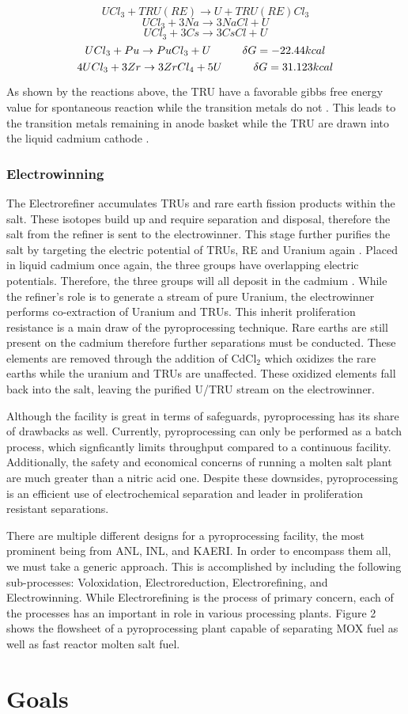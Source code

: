 \[ UCl_3+TRU(RE) \rightarrow U + TRU(RE)Cl_3 \]
\[ UCl_3 + 3Na \rightarrow 3NaCl + U \]
\[ UCl_3 + 3Cs \rightarrow 3CsCl + U \]
\[ UCl_3 + Pu \rightarrow PuCl_3 + U \hspace{10mm} \delta G = -22.44kcal \]
\[ 4UCl_3 + 3Zr \rightarrow 3ZrCl_4 + 5U \hspace{10mm} \delta G = 31.123kcal \]

As shown by the reactions above, the TRU have a favorable gibbs free energy value for spontaneous reaction while the transition metals do not \cite{supy}.
This leads to the transition metals remaining in anode basket while the TRU are drawn into the liquid cadmium cathode \cite{lee_korean_2011}.


\subsubsection{Electrowinning}
The Electrorefiner accumulates TRUs and rare earth fission products within the salt.
These isotopes build up and require separation and disposal, therefore the salt from the refiner is sent to the electrowinner.
This stage further purifies the salt by targeting the electric potential of TRUs, RE and Uranium again \cite{lee_korean_2011,organisation}.
Placed in liquid cadmium once again, the three groups have overlapping electric potentials.
Therefore, the three groups will all deposit in the cadmium \cite{lee_korean_2011}. 
While the refiner's role is to generate a stream of pure Uranium, the electrowinner performs co-extraction of Uranium and TRUs.
This inherit proliferation resistance is a main draw of the pyroprocessing technique.
Rare earths are still present on the cadmium therefore further separations must be conducted.
These elements are removed through the addition of CdCl$_2$ which oxidizes the rare earths while the uranium and TRUs are unaffected.
These oxidized elements fall back into the salt, leaving the purified U/TRU stream on the electrowinner.


Although the facility is great in terms of safeguards, pyroprocessing has its share of drawbacks as well.
Currently, pyroprocessing can only be performed as a batch process, which signficantly limits throughput compared to a continuous facility. 
Additionally, the safety and economical concerns of running a molten salt plant are much greater than a nitric acid one.
Despite these downsides, pyroprocessing is an efficient use of electrochemical separation and leader in proliferation resistant separations.

There are multiple different designs for a pyroprocessing facility, the most prominent being from ANL, INL, and KAERI. In order to encompass them all, we must take a generic approach. This is accomplished by including the following sub-processes: Voloxidation, Electroreduction, Electrorefining, and Electrowinning. While Electrorefining is the process of primary concern, each of the processes has an important in role in various processing plants. Figure 2 shows the flowsheet of a pyroprocessing plant capable of separating MOX fuel as well as fast reactor molten salt fuel.

\section{Goals}
